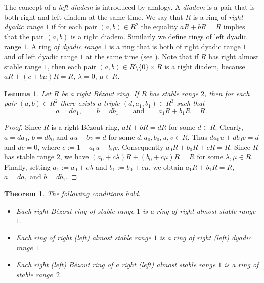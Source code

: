 \documentclass[10pt,a4paper]{amsart}
\theoremstyle{plain}
\newtheorem{theorem}{Theorem}
\newtheorem{lemma}{Lemma}
\theoremstyle{definition}
\begin{document}

The  concept of a {\it  left diadem}  is  introduced by analogy.
A {\it diadem} is a pair that is both right and  left diadem at the same time. We say that $R$ is a ring of {\it right dyadic range $1$} if for each pair $(a,b)\in R^2$ the equality $aR+bR=R$ implies that the pair $(a,b)$ is a right diadem. Similarly we define  rings of left dyadic range $1$. A ring  {\it of dyadic range $1$} is a ring that is both of right dyadic range $1$ and of  left dyadic range $1$ at the same time (see \cite[Definition~2.1 and Definition~2.3]{3-zabavsky}).
Note that if $R$  has  right almost stable range $1$,  then each pair $(a,b)\in R\setminus\{0\}\times R$ is  a right diadem,   because
$aR+(c+b\mu)R=R$, $\lambda=0$, $\mu\in R$.



%
%

\begin{lemma}\label{Lemma:1}
Let $R$ be a right B\'ezout ring.
If\/ $R$  has  stable range $2$,  then for each  pair $(a,b)\in R^2$ there exists  a triple $(d,a_1,b_1)\in R^3$ such that
\[
a=da_1,\qquad  b=db_1 \qquad \text{and}\qquad  a_1R+b_1R=R.
\]
\end{lemma}
\begin{proof}
Since $R$ is a right B\'ezout ring, $aR+bR=dR$ for some $d\in R$. Clearly,   $a=da_0$, \linebreak
$b=db_0$ and $au+bv=d$ for some $d,a_0,b_0,u,v\in R$.
Thus   $da_0u+db_0v=d$ and   $dc=0$, where  \linebreak
$c:=1-a_0u-b_0v$.  Consequently $a_0R+b_0R+cR=R$. Since $R$ has  stable range $2$, we have
$(a_0+c\lambda)R+(b_0+c\mu)R=R$
for some $\lambda,\mu\in R$.
Finally, setting   $a_1:=a_0+c\lambda$ and $b_1:=b_0+c\mu$,  we obtain $a_1R+b_1R=R$,  $a=da_1$ and  $b=db_1$.
\end{proof}

\begin{theorem}\label{T:1}
The following conditions hold.
\begin{itemize}
\item[(i)] Each right B\'ezout ring of stable range $1$ is a ring of right almost stable range $1$.
\item[(ii)] Each ring of right (left) almost  stable range $1$ is a ring of right (left)  dyadic  range $1$.
\item[(iii)] Each right (left) B\'ezout ring of a right (left) almost stable range $1$ is a ring of stable  range~$2$.
\end{itemize}
\end{theorem}
\end{document}
